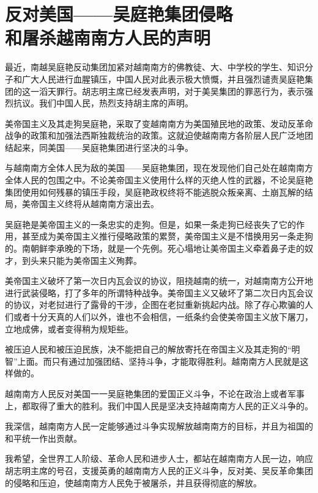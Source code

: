 \section[反对美国——吴庭艳集团侵略和屠杀越南南方人民的声明（一九六三年八月二十九日）]{反对美国——吴庭艳集团侵略\\和屠杀越南南方人民的声明}


最近，南越吴庭艳反动集团加紧对越南南方的佛教徒、大、中学校的学生、知识分子和广大人民进行血腥镇压，中国人民对此表示极大愤慨，并且强烈谴责吴庭艳集团的这一滔天罪行。胡志明主席已经发表声明，对于美吴集团的罪恶行为，表示强烈抗议。我们中国人民，热烈支持胡主席的声明。

美帝国主义及其走狗吴庭艳，采取了变越南南方为美国殖民地的政策、发动反革命战争的政策和加强法西斯独裁统治的政策。这就迫使越南南方各阶层人民广泛地团结起来，同美国——吴庭艳集团进行坚决的斗争。

与越南南方全体人民为敌的美国——吴庭艳集团，现在发现他们自己处在越南南方全体人民的包围之中。不论美帝国主义使用什么样的灭绝人性的武器，不论吴庭艳集团使用如何残暴的镇压手段，吴庭艳政权终将不能逃脱众叛亲离、土崩瓦解的结局，美帝国主义终将从越南南方滚出去。

吴庭艳是美帝国主义的一条忠实的走狗。但是，如果一条走狗已经丧失了它的作用，甚至成为美帝国主义推行侵略政策的累赘，美帝国主义是不惜换用另一条走狗的。南朝鲜李承晚的下场，就是一个先例。死心塌地让美帝国主义牵着鼻子走的奴才，到头来只能为美帝国主义殉葬。

美帝国主义破坏了第一次日内瓦会议的协议，阻挠越南的统一，对越南南方公开地进行武装侵略，打了多年的所谓特种战争。美帝国主义又破坏了第二次日内瓦会议的协议，对老挝进行了露骨的干涉，企图在老挝重新挑起内战。除了存心欺骗的人们或者十分天真的人们以外，谁也不会相信，一纸条约会使美帝国主义放下屠刀，立地成佛，或者变得稍为规矩些。

被压迫人民和被压迫民族，决不能把自己的解放寄托在帝国主义及其走狗的“明智”上面。而只有通过加强团结、坚持斗争，才能取得胜利。越南南方人民就是这样做的。

越南南方人民反对美国一一吴庭艳集团的爱国正义斗争，不论在政治上或者军事上，都取得了重大的胜利。我们中国人民是坚决支持越南南方人民的正义斗争的。

我深信，越南南方人民一定能够通过斗争实现解放越南南方的目标，并且为祖国的和平统一作出贡献。

我希望，全世界工人阶级、革命人民和进步人士，都站在越南南方人民一边，响应胡志明主席的号召，支援英勇的越南南方人民的正义斗争，反对美、吴反革命集团的侵略和压迫，使越南南方人民免于被屠杀，并且获得彻底的解放。


